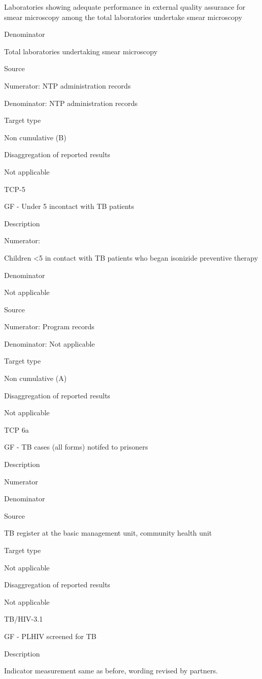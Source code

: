 \documentclass[]{book}
\begin{document}
Laboratories showing adequate performance in external quality assurance for smear microscopy among the total laboratories undertake smear microscopy

Denominator

Total laboratories undertaking smear microscopy

Source

Numerator: NTP administration records

Denominator: NTP administration records

Target type

Non cumulative (B)

Disaggregation of reported results

Not applicable

TCP-5

GF - Under 5 incontact with TB patients

Description

Numerator:

Children \textless{}5 in contact with TB patients who began isonizide preventive therapy

Denominator

Not applicable

Source

Numerator: Program records

Denominator: Not applicable

Target type

Non cumulative (A)

Disaggregation of reported results

Not applicable

TCP 6a

GF - TB cases (all forms) notifed to prisoners

Description

Numerator

Denominator

Source

TB register at the basic management unit, community health unit

Target type

Not applicable

Disaggregation of reported results

Not applicable

TB/HIV-3.1

GF - PLHIV screened for TB

Description

Indicator measurement same as before, wording revised by partners.
\end{document}
